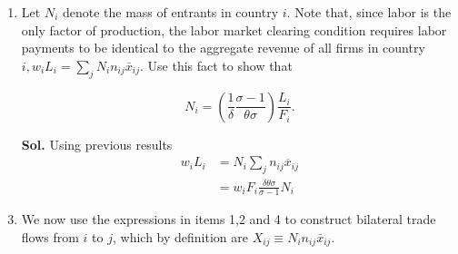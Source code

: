 \documentclass[12pt,oneside,reqno]{amsart}
\begin{document}
\begin{enumerate}[label=\textbf{\roman*.}]
\item Let $N_{i}$ denote the mass of entrants in country $i$. Note that, since labor is the only factor of production, the labor market clearing condition requires labor payments to be identical to the aggregate revenue of all firms in country $i, w_{i} L_{i}=\sum_{j} N_{i} n_{i j} \bar{x}_{i j}$. Use this fact to show that

\begin{equation*}
N_{i}=\left(\frac{1}{\delta} \frac{\sigma-1}{\theta \sigma}\right) \frac{L_{i}}{F_{i}} .
\end{equation*}

\item[\textbf{Sol.}] Using previous results
\begin{align*}
    w_iL_i &= N_i\sum_j n_{ij}\overline{x}_{ij} \\ 
    &= w_iF_i\frac{\delta\theta\sigma}{\sigma-1} N_i
\end{align*}

\item We now use the expressions in items 1,2 and 4 to construct bilateral trade flows from $i$ to $j$, which by definition are $X_{i j} \equiv N_{i} n_{i j} \bar{x}_{i j}$.


\end{enumerate}
\end{document}
